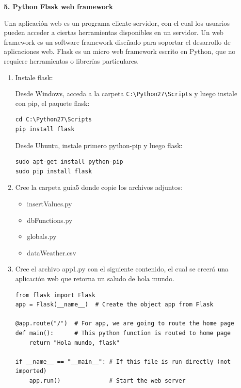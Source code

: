 \documentclass[10pt,letterpaper]{article}
\begin{document}
\begin{center}
\textbf{5. Python Flask web framework}
\end{center}
Una aplicación web es un programa cliente-servidor, con el cual los usuarios pueden acceder a ciertas herramientas disponibles en un servidor. Un web framework es un software framework diseñado para soportar el desarrollo de aplicaciones web. Flask es un micro web framework escrito en Python, que no requiere herramientas o librerías particulares.


\begin{enumerate}

\item Instale flask:

Desde Windows, acceda a la carpeta \verb|C:\Python27\Scripts| y luego instale con pip, el paquete flask:
\begin{verbatim}
cd C:\Python27\Scripts
pip install flask
\end{verbatim}

Desde Ubuntu, instale primero python-pip y luego flask:
\begin{verbatim}
sudo apt-get install python-pip
sudo pip install flask
\end{verbatim}

\item Cree la carpeta guia5 donde copie los archivos adjuntos: 
\begin{itemize}
\item insertValues.py
\item dbFunctions.py
\item globals.py
\item dataWeather.csv
\end{itemize}

\item Cree el archivo app1.py con el siguiente contenido, el cual se creerá una aplicación web que retorna un saludo de hola mundo. 
\begin{lstlisting}[style=myCustomPythonStyle]
from flask import Flask
app = Flask(__name__)  # Create the object app from Flask

@app.route("/")  # For app, we are going to route the home page
def main():      # This python function is routed to home page
    return "Hola mundo, flask"

if __name__ == "__main__": # If this file is run directly (not imported)
    app.run()              # Start the web server
\end{lstlisting}


\end{enumerate}
\end{document}
